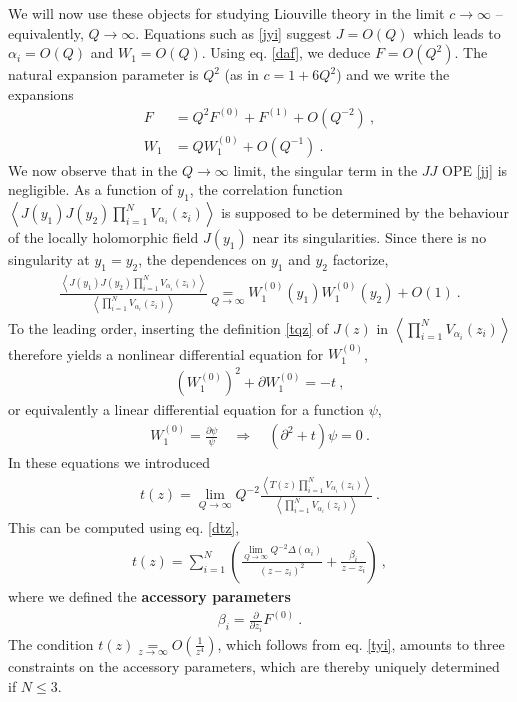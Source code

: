 \documentclass[12pt,a4paper,notitlepage]{report}
\numberwithin{equation}{section}
\theoremstyle{break}
\begin{document}
We will now use these objects for studying Liouville theory in the limit $c\rightarrow \infty$ -- equivalently, $Q\rightarrow \infty$.
Equations such as \eqref{jyi} suggest $J=O(Q)$ which leads to $\alpha_i=O(Q)$ and $W_1=O(Q)$.
Using eq. \eqref{daf}, we deduce $F=O(Q^2)$.
The natural expansion parameter is $Q^2$ (as in $c=1+6Q^2$) and we write the expansions
\begin{align}
 F &= Q^2 F^{(0)} + F^{(1)} + O(Q^{-2})\ ,
\\
W_1 & = QW_1^{(0)} + O(Q^{-1})\ .
\end{align}
We now observe that in the $Q\rightarrow \infty$ limit, the singular term in the $JJ$ OPE \eqref{jj} is negligible.
As a function of $y_1$, the correlation function $ \left\langle J(y_1)J(y_2)\prod_{i=1}^N V_{\alpha_i}(z_i) \right\rangle$ is supposed to be determined by the behaviour of the locally holomorphic field $J(y_1)$ near its singularities.
Since there is no singularity at $y_1=y_2$, the dependences on $y_1$ and $y_2$  factorize,    
\begin{align}
 \frac{\left\langle J(y_1)J(y_2)\prod_{i=1}^N V_{\alpha_i}(z_i)\right\rangle}{\left\langle \prod_{i=1}^N V_{\alpha_i}(z_i) \right\rangle} \underset{Q\rightarrow \infty}{=} W_1^{(0)}(y_1)W_1^{(0)}(y_2) + O(1)\ .
\end{align}
To the leading order, inserting the definition \eqref{tqz} of $J(z)$ in $\left\langle \prod_{i=1}^N V_{\alpha_i}(z_i) \right\rangle$ therefore yields a nonlinear differential equation for $W_1^{(0)}$,
\begin{align}
 \boxed{\left(W_1^{(0)}\right)^2 + \partial W_1^{(0)} = - t}\ ,
\label{wwwt}
\end{align}
or equivalently a linear differential equation for a function $\psi$,
\begin{align}
 \boxed{W_1^{(0)} = \frac{\partial\psi}{\psi} \quad \Rightarrow \quad (\partial^2 + t ) \psi = 0}\ .
\label{dtp}
\end{align}
In these equations we introduced
\begin{align}
 t(z) = \underset{Q\rightarrow \infty}{\lim} Q^{-2} \frac{\left\langle T(z) \prod_{i=1}^N V_{\alpha_i}(z_i) \right\rangle}{\left\langle \prod_{i=1}^N V_{\alpha_i}(z_i) \right\rangle}\ .
\end{align}
This can be computed using eq. \eqref{dtz}, 
\begin{align}
 t(z) = \sum_{i=1}^N \left( \frac{\underset{Q\rightarrow\infty}{\lim} Q^{-2}\Delta(\alpha_i)}{(z-z_i)^2} + \frac{\beta_i}{z-z_i} \right)\ ,
\label{tzs}
\end{align}
where we defined the \textbf{\boldmath accessory parameters} 
\begin{align}
 \beta_i = {\frac{\partial}{\partial z_i}} F^{(0)}\ .
\end{align}
The condition $t(z) \underset{z\rightarrow \infty}{=} O(\frac{1}{z^4})$, which follows from eq. \eqref{tyi}, amounts to three constraints on the accessory parameters, which are thereby uniquely determined if $N\leq 3$. 
\end{document}
